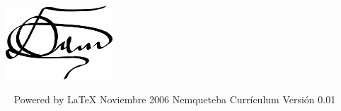 \documentclass[overlapped,line,final,letterpaper]{res}
\begin{document}
\begin{resume}
\vspace{\fill}
\begin{minipage}{1.0\linewidth}
\begin{center}
	\includegraphics[width=4cm,bb=0 0 598 417]{./firma.jpeg}
\end{center}

\end{minipage}

\vspace{\fill}\ \newline
{\tiny \rm $ $Powered by \LaTeX $ $ }
{\tiny \rm $ $Noviembre 2006$ $ }
{\tiny \rm $ $Nemqueteba Currículum Versión 0.01 $ $ }

\end{resume}
\end{document}
